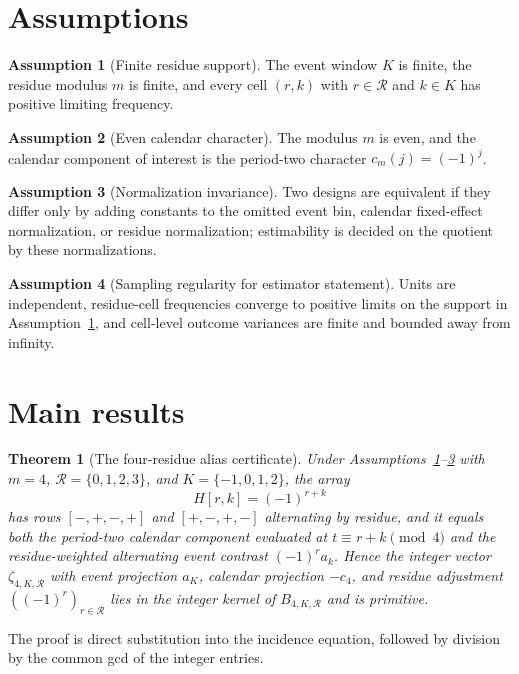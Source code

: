 \documentclass[11pt]{article}
\newcommand{\calR}{\mathcal{R}}
\theoremstyle{definition}
\newtheorem{assumption}{Assumption}
\theoremstyle{plain}
\newtheorem{theorem}{Theorem}
\theoremstyle{remark}
\begin{document}
\section{Assumptions}
\begin{assumption}[Finite residue support]\label{ass:finite-residue}
The event window $K$ is finite, the residue modulus $m$ is finite, and every cell $(r,k)$ with $r\in\calR$ and $k\in K$ has positive limiting frequency.
\end{assumption}

\begin{assumption}[Even calendar character]\label{ass:period-two}
The modulus $m$ is even, and the calendar component of interest is the period-two character $c_m(j)=(-1)^j$.
\end{assumption}

\begin{assumption}[Normalization invariance]\label{ass:normalization}
Two designs are equivalent if they differ only by adding constants to the omitted event bin, calendar fixed-effect normalization, or residue normalization; estimability is decided on the quotient by these normalizations.
\end{assumption}

\begin{assumption}[Sampling regularity for estimator statement]\label{ass:sampling}
Units are independent, residue-cell frequencies converge to positive limits on the support in Assumption~\ref{ass:finite-residue}, and cell-level outcome variances are finite and bounded away from infinity.
\end{assumption}

\section{Main results}
\begin{theorem}[The four-residue alias certificate]\label{thm:four-residue}
Under Assumptions~\ref{ass:finite-residue}--\ref{ass:normalization} with $m=4$, $\calR=\{0,1,2,3\}$, and $K=\{-1,0,1,2\}$, the array
\[
  H[r,k]=(-1)^{r+k}
\]
has rows $[-,+,-,+]$ and $[+,-,+,-]$ alternating by residue, and it equals both the period-two calendar component evaluated at $t\equiv r+k\pmod 4$ and the residue-weighted alternating event contrast $(-1)^r a_k$. Hence the integer vector $\zeta_{4,K,\calR}$ with event projection $a_K$, calendar projection $-c_4$, and residue adjustment $((-1)^r)_{r\in\calR}$ lies in the integer kernel of $B_{4,K,\calR}$ and is primitive.
\end{theorem}
The proof is direct substitution into the incidence equation, followed by division by the common gcd of the integer entries.
\end{document}

